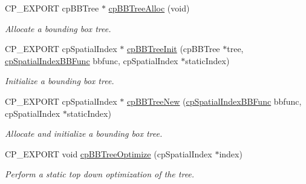 \begin{DoxyCompactItemize}
\item 
\mbox{\label{group__cp_spatial_index_gaae40a748ead4cadb9cc03b32947d37cc}} 
C\+P\+\_\+\+E\+X\+P\+O\+RT cp\+B\+B\+Tree $\ast$ \mbox{\hyperlink{group__cp_spatial_index_gaae40a748ead4cadb9cc03b32947d37cc}{cp\+B\+B\+Tree\+Alloc}} (void)
\begin{DoxyCompactList}\small\item\em Allocate a bounding box tree. \end{DoxyCompactList}\item 
\mbox{\label{group__cp_spatial_index_gabf7967b5736584641f59a0ecc60ed5a0}} 
C\+P\+\_\+\+E\+X\+P\+O\+RT cp\+Spatial\+Index $\ast$ \mbox{\hyperlink{group__cp_spatial_index_gabf7967b5736584641f59a0ecc60ed5a0}{cp\+B\+B\+Tree\+Init}} (cp\+B\+B\+Tree $\ast$tree, \mbox{\hyperlink{group__cp_spatial_index_gaa8cf991cadcee1fbb6ee9379a0a6e0ea}{cp\+Spatial\+Index\+B\+B\+Func}} bbfunc, cp\+Spatial\+Index $\ast$static\+Index)
\begin{DoxyCompactList}\small\item\em Initialize a bounding box tree. \end{DoxyCompactList}\item 
\mbox{\label{group__cp_spatial_index_ga644b5ce154690f88cbdb84f9315ba317}} 
C\+P\+\_\+\+E\+X\+P\+O\+RT cp\+Spatial\+Index $\ast$ \mbox{\hyperlink{group__cp_spatial_index_ga644b5ce154690f88cbdb84f9315ba317}{cp\+B\+B\+Tree\+New}} (\mbox{\hyperlink{group__cp_spatial_index_gaa8cf991cadcee1fbb6ee9379a0a6e0ea}{cp\+Spatial\+Index\+B\+B\+Func}} bbfunc, cp\+Spatial\+Index $\ast$static\+Index)
\begin{DoxyCompactList}\small\item\em Allocate and initialize a bounding box tree. \end{DoxyCompactList}\item 
\mbox{\label{group__cp_spatial_index_gab7b59516c70b93b7fb6d185c64bce301}} 
C\+P\+\_\+\+E\+X\+P\+O\+RT void \mbox{\hyperlink{group__cp_spatial_index_gab7b59516c70b93b7fb6d185c64bce301}{cp\+B\+B\+Tree\+Optimize}} (cp\+Spatial\+Index $\ast$index)
\begin{DoxyCompactList}\small\item\em Perform a static top down optimization of the tree. \end{DoxyCompactList}\item 

\end{DoxyCompactItemize}
